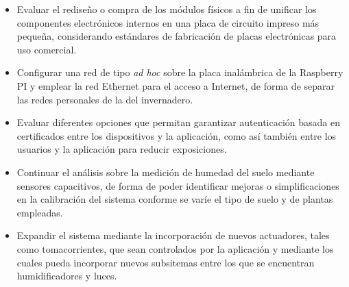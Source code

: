 \begin{itemize}
\item Evaluar el rediseño o compra de los módulos físicos a fin de unificar los componentes electrónicos internos en una placa de circuito impreso más pequeña, considerando estándares de fabricación de placas electrónicas para uso comercial.

\item Configurar una red de tipo \textit{ad hoc} sobre la placa inalámbrica de la Raspberry PI y emplear la red Ethernet para el acceso a Internet, de forma de separar las redes personales de la del invernadero.

\item Evaluar diferentes opciones que permitan garantizar autenticación basada en certificados entre los dispositivos y la aplicación, como así también entre los usuarios y la aplicación para reducir exposiciones.

\item Continuar el análisis sobre la medición de humedad del suelo mediante sensores capacitivos, de forma de poder identificar mejoras o simplificaciones en la calibración del sistema conforme se varíe el tipo de suelo y de plantas empleadas. 

\item Expandir el sistema mediante la incorporación de nuevos actuadores, tales como tomacorrientes, que sean controlados por la aplicación y mediante los cuales pueda incorporar nuevos subsitemas entre los que se encuentran humidificadores y luces. 

\end{itemize}